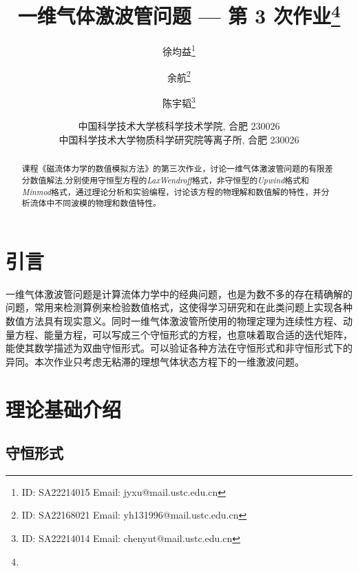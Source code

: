 \documentclass[10.5pt
]{article}
\title{一维气体激波管问题 --- 第 3 次作业\footnote{\Term\Course}}
\author{徐均益\footnote{ID: SA22214015 Email: jyxu@mail.ustc.edu.cn}
  \and
  余航\footnote{ID: SA22168021 Email: yh131996@mail.ustc.edu.cn}
  \and
  陈宇韬\footnote{ID: SA22214014 Email: chenyut@mail.ustc.edu.cn}
}
\date{%
\scriptsize%
中国科学技术大学核科学技术学院, 合肥 230026 \\
中国科学技术大学物质科学研究院等离子所, 合肥 230026
%
}
\begin{document}
\maketitle

\begin{abstract}
课程《磁流体力学的数值模拟方法》的第三次作业，讨论一维气体激波管问题的有限差分数值解法,分别使用守恒型方程的\textit{LaxWendroff}格式，非守恒型的\textit{Upwind}格式和\textit{Minmod}格式，通过理论分析和实验编程，讨论该方程的物理解和数值解的特性，并分析流体中不同波模的物理和数值特性。 

\end{abstract}

\section{引言}
一维气体激波管问题是计算流体力学中的经典问题，也是为数不多的存在精确解的问题，常用来检测算例来检验数值格式，这使得学习研究和在此类问题上实现各种数值方法具有现实意义。同时一维气体激波管所使用的物理定理为连续性方程、动量方程、能量方程，可以写成三个守恒形式的方程，也意味着取合适的迭代矩阵，能使其数学描述为双曲守恒形式。可以验证各种方法在守恒形式和非守恒形式下的异同。本次作业只考虑无粘滞的理想气体状态方程下的一维激波问题。

\section{理论基础介绍}
\subsection{守恒形式}
\end{document}
